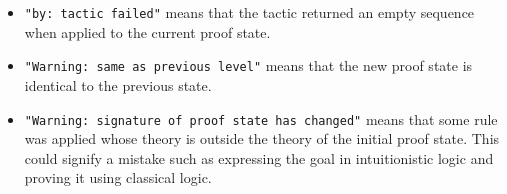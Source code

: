 \nobreak
\begin{itemize}
\item {\footnotesize\tt "by:\ tactic failed"} means that the tactic
  returned an empty sequence when applied to the current proof state.
\item {\footnotesize\tt "Warning:\ same as previous level"} means that the
  new proof state is identical to the previous state.
\item{\footnotesize\tt "Warning:\ signature of proof state has changed"}
  means that some rule was applied whose theory is outside the theory of
  the initial proof state.  This could signify a mistake such as expressing
  the goal in intuitionistic logic and proving it using classical logic.
\end{itemize}

